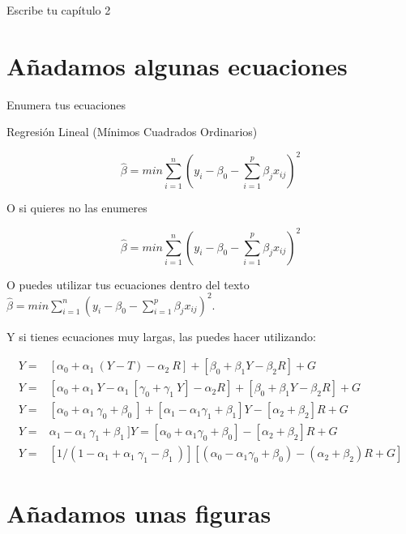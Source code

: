 \setlength{\parskip}{1em}

Escribe tu capítulo 2


\section{Añadamos algunas ecuaciones}
\setlength{\parindent}{0em}

Enumera tus ecuaciones

Regresión Lineal (Mínimos Cuadrados Ordinarios)

\begin{equation}
\hat{\beta }=min\sum_{i=1}^{n}\left ( y_i-\beta_0-\sum_{i=1}^{p} \beta _{j}x_{ij} \right )^{2}
\end{equation}

O si quieres no las enumeres

$$\hat{\beta }=min\sum_{i=1}^{n}\left ( y_i-\beta_0-\sum_{i=1}^{p} \beta _{j}x_{ij} \right )^{2}$$

O puedes utilizar tus ecuaciones dentro del texto $\hat{\beta }=min\sum_{i=1}^{n}\left ( y_i-\beta_0-\sum_{i=1}^{p} \beta _{j}x_{ij} \right )^{2}$.

Y si tienes ecuaciones muy largas, las puedes hacer utilizando:

\begin{equation}
\begin{aligned}
Y  = & [\alpha_0+\alpha_1\ (Y-T)-\alpha_2\ R]+[\beta_0+\beta_1 Y-\beta_2 R]+G\\
Y  = & [\alpha_0+\alpha_1\ Y-\alpha_1\ [\gamma_0+\gamma_1\ Y]-\alpha_2 R]+[\beta_0+\beta_1 Y-\beta_2R]+G\\
Y  = &  [\alpha_0+\alpha_1\ \gamma_0+\beta_0\ ]+[\alpha_1-\alpha_1 \gamma_1+\beta_1 ]Y-[\alpha_2+\beta_2]R+G\\
Y  = & \alpha_1-\alpha_1\ \gamma_1+\beta_1\ ]Y=[\alpha_0+\alpha_1 \gamma_0+\beta_0 ]-[\alpha_2+\beta_2 ]R+G\\
Y  = & [1/(1-\alpha_1+\alpha_1\ \gamma_1-\beta_1\ )][(\alpha_0-\alpha_1 \gamma_0+\beta_0)-(\alpha_2+\beta_2)R+G] 
\end{aligned}
\end{equation}

\section{Añadamos unas figuras}


